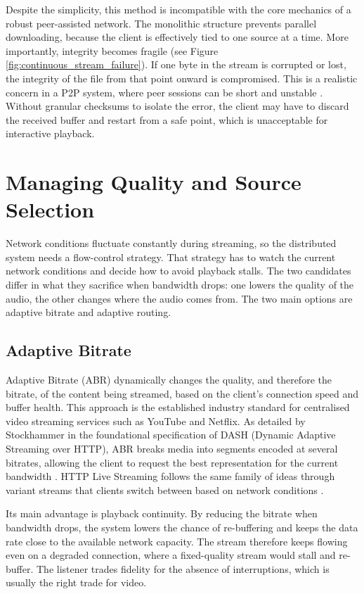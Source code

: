 \par Despite the simplicity, this method is incompatible with the core mechanics of a robust peer-assisted network. The monolithic structure prevents parallel downloading, because the client is effectively tied to one source at a time. More importantly, integrity becomes fragile (see Figure \ref{fig:continuous_stream_failure}). If one byte in the stream is corrupted or lost, the integrity of the file from that point onward is compromised. This is a realistic concern in a P2P system, where peer sessions can be short and unstable \cite{measurement_p2p}. Without granular checksums to isolate the error, the client may have to discard the received buffer and restart from a safe point, which is unacceptable for interactive playback.


\section{Managing Quality and Source Selection}
\indent \par Network conditions fluctuate constantly during streaming, so the distributed system needs a flow-control strategy. That strategy has to watch the current network conditions and decide how to avoid playback stalls. The two candidates differ in what they sacrifice when bandwidth drops: one lowers the quality of the audio, the other changes where the audio comes from. The two main options are adaptive bitrate and adaptive routing.

\subsection{Adaptive Bitrate}
\indent \par Adaptive Bitrate (ABR) dynamically changes the quality, and therefore the bitrate, of the content being streamed, based on the client's connection speed and buffer health. This approach is the established industry standard for centralised video streaming services such as YouTube and Netflix. As detailed by Stockhammer in the foundational specification of DASH (Dynamic Adaptive Streaming over HTTP), ABR breaks media into segments encoded at several bitrates, allowing the client to request the best representation for the current bandwidth \cite{standards_streaming_http}. HTTP Live Streaming follows the same family of ideas through variant streams that clients switch between based on network conditions \cite{hls_rfc8216}.


\par Its main advantage is playback continuity. By reducing the bitrate when bandwidth drops, the system lowers the chance of re-buffering and keeps the data rate close to the available network capacity. The stream therefore keeps flowing even on a degraded connection, where a fixed-quality stream would stall and re-buffer. The listener trades fidelity for the absence of interruptions, which is usually the right trade for video.

